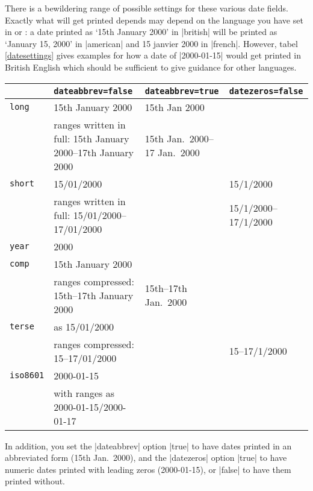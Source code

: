 There is a bewildering range of possible settings for these various
date fields. Exactly what will get printed depends may depend on the
language you have set in  or : a
date printed as `15th January 2000' in |british| will be printed as
`January 15, 2000' in |american| and 15 janvier 2000 in
|french|. However, tabel \ref{datesettings} gives examples for how a
date of |2000-01-15| would get printed in British English which should
be sufficient to give guidance for other languages.
\begin{table*}
  \begin{tabular}{lp{2.8in}lp{1in}}
    \toprule
                          & \texttt{dateabbrev=false}                                    & \texttt{dateabbrev=true} & \texttt{datezeros=false} \\
    \midrule\texttt{long} & 15th January 2000                                            & 15th Jan 2000                                       \\
                          & ranges written in full: 15th January 2000--17th January 2000 & 15th Jan.\ 2000--17 Jan.\ 2000                      \\
    \texttt{short}        & 15/01/2000                                                   &                          & 15/1/2000                \\
                          & ranges written in full: 15/01/2000--17/01/2000               &                          & 15/1/2000--17/1/2000     \\
    \texttt{year}         & 2000                                                                                                               \\
    \texttt{comp}         & 15th January 2000                                                                                                  \\
                          & ranges compressed: 15th--17th January 2000                   & 15th--17th Jan.\ 2000                               \\
    \texttt{terse}        & as 15/01/2000                                                                                                      \\
                          & ranges compressed: 15--17/01/2000                            &                          & 15--17/1/2000            \\
    \texttt{iso8601}      & 2000-01-15                                                                                                         \\
                          & with ranges as 2000-01-15/2000-01-17                                                                               \\
    \bottomrule
\end{tabular}
\caption{Various date settings\label{datesettings}}
\end{table*}
In addition, you set the |dateabbrev| option |true| to have dates
printed in an abbreviated form (15th Jan.\ 2000), and the |datezeros|
option |true| to have numeric dates printed with leading zeros
(2000-01-15), or |false| to have them printed without.

